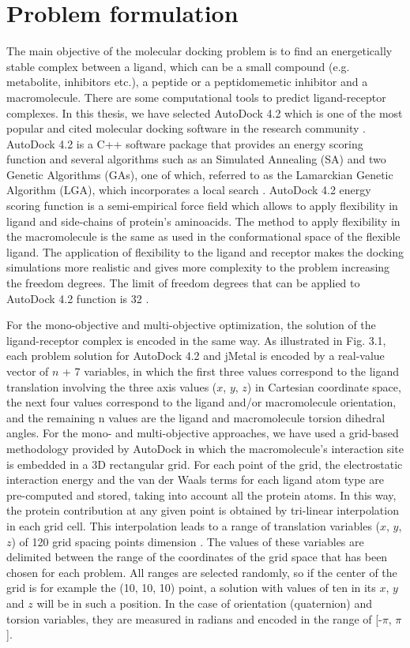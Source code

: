\section{Problem formulation}
\label{sec:problemFormulation}

The main objective of the molecular docking problem is to find an energetically stable complex between a ligand, which can be a small compound (e.g. metabolite, inhibitors etc.), a peptide or a peptidomemetic inhibitor and a macromolecule. There are some computational tools to predict ligand-receptor complexes. In this thesis, we have selected AutoDock 4.2 which is one of the most popular and cited molecular docking software in the research community \cite{Sousa2006,Cosconati2010}. AutoDock 4.2 is a C++ software package that provides an energy scoring function and several algorithms such as an Simulated Annealing (SA) and two Genetic Algorithms (GAs), one of which, referred to as the Lamarckian Genetic Algorithm (LGA), which incorporates a local search \cite{Morris1998}. AutoDock 4.2 energy scoring function is a semi-empirical force field which allows to apply flexibility in ligand and side-chains of protein's aminoacids. The method to apply flexibility in the macromolecule is the same as used in the conformational space of the flexible ligand. The application of flexibility to the ligand and receptor makes the docking simulations more realistic and gives more complexity to the problem increasing the freedom degrees. The limit of freedom degrees that can be applied to AutoDock 4.2 function is 32 \cite{Morris2009}.

For the mono-objective and multi-objective optimization, the solution of the ligand-receptor complex is encoded in the same way. As illustrated in Fig. 3.1, each problem solution for AutoDock 4.2 and jMetal is encoded by a real-value vector of $n$ + 7 variables, in which the first three values correspond to the ligand translation involving the three axis values ($x$, $y$, $z$) in Cartesian coordinate space, the next four values correspond to the ligand and/or macromolecule orientation, and the remaining n values are the ligand and macromolecule torsion dihedral angles. For the mono- and multi-objective approaches, we have used a grid-based methodology provided by AutoDock in which the macromolecule's interaction site is embedded in a 3D rectangular grid. For each point of the grid, the electrostatic interaction energy and the van der Waals terms for each ligand atom type are pre-computed and stored, taking into account all the protein atoms. In this way, the protein contribution at any given point is obtained by tri-linear interpolation in each grid cell. This interpolation leads to a range of translation variables ($x$, $y$, $z$) of 120 grid spacing points dimension \cite{web-autodock}. The values of these variables are delimited between the range of the coordinates of the grid space that has been chosen for each problem. All ranges are selected randomly, so if the center of the grid is for example the (10, 10, 10) point, a solution with values of ten in its $x$, $y$ and $z$ will be in such a position. In the case of orientation (quaternion) and torsion variables, they are measured in radians and encoded in the range of [-$\pi$, $\pi$].

